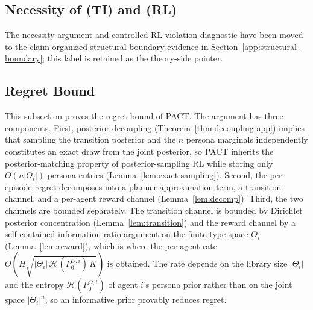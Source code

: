 \subsection{Necessity of (TI) and (RL)}
\label{app:necessity}
\label{sec:necessity}

The necessity argument and controlled RL-violation diagnostic have been moved to the claim-organized structural-boundary evidence in Section~\ref{app:structural-boundary}; this label is retained as the theory-side pointer.

\subsection{Regret Bound}
\label{app:regret-bound}
\label{sec:regret-bound-app}

This subsection proves the regret bound of PACT. The argument has three components. First, posterior decoupling (Theorem~\ref{thm:decoupling-app}) implies that sampling the transition posterior and the $n$ persona marginals independently constitutes an exact draw from the joint posterior, so PACT inherits the posterior-matching property of posterior-sampling RL while storing only $O(n|\Theta_i|)$ persona entries (Lemma~\ref{lem:exact-sampling}). Second, the per-episode regret decomposes into a planner-approximation term, a transition channel, and a per-agent reward channel (Lemma~\ref{lem:decomp}). Third, the two channels are bounded separately. The transition channel is bounded by Dirichlet posterior concentration (Lemma~\ref{lem:transition}) and the reward channel by a self-contained information-ratio argument on the finite type space $\Theta_i$ (Lemma~\ref{lem:reward}), which is where the per-agent rate $O(H\sqrt{|\Theta_i|\,\mathcal H(P_0^{\Theta,i})\,K})$ is obtained. The rate depends on the library size $|\Theta_i|$ and the entropy $\mathcal H(P_0^{\Theta,i})$ of agent $i$'s persona prior rather than on the joint space $|\Theta_i|^n$, so an informative prior provably reduces regret.


